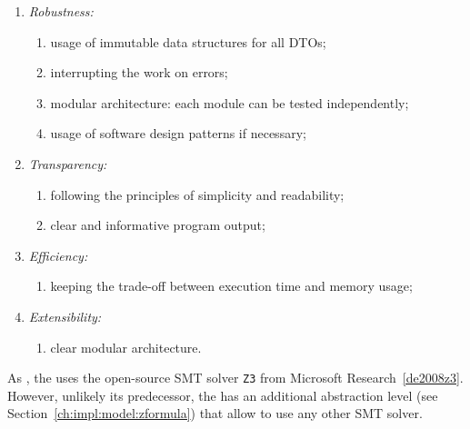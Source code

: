 \vspace{0.5em}
\begin{enumerate}[nolistsep]
  \item \textit{Robustness:}
    \begin{enumerate}[label*=\arabic*.]
      \item usage of immutable data structures for all DTOs;
      \item interrupting the work on errors;
      \item modular architecture: each module can be tested independently;
      \item usage of software design patterns if necessary;
    \end{enumerate}
  \item \textit{Transparency:}
    \begin{enumerate}[label*=\arabic*.]
      \item following the principles of simplicity and readability;
      \item clear and informative program output;
    \end{enumerate}
  \item \textit{Efficiency:}
    \begin{enumerate}[label*=\arabic*.]%
      \item keeping the trade-off between execution time and memory usage;
    \end{enumerate}
  \item \textit{Extensibility:}
    \begin{enumerate}[label*=\arabic*.]%
      \item clear modular architecture.
    \end{enumerate}
\end{enumerate}


As \porthos[1], the \porthos[2] uses the open-source SMT solver \texttt{Z3} from Microsoft Research~\ref{de2008z3}. However, unlikely its predecessor, the \porthos[2] has an additional abstraction level \zformula (see Section~\ref{ch:impl:model:zformula}) that allow to use any other SMT solver. %

